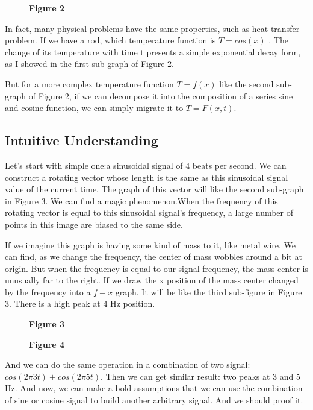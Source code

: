\documentclass[margin,line]{res}
\begin{document}
\begin{resume}
\begin{figure}[H]
\begin{minipage}{0.55\linewidth}
    \centerline{\textbf{Figure 2}}
  \end{minipage}
\end{figure}
In fact, many physical problems have the same properties, such as heat transfer problem. If we have a rod, which temperature function is $T=cos(x)$ .
The change of its temperature with time t presents a simple exponential decay form, as I showed in the first sub-graph of Figure 2.\par
But for a more complex temperature function $T=f(x)$ like the second sub-graph of Figure 2, if we can decompose it into the composition of a series sine and cosine function, we can simply migrate it to $T=F(x,t)$.

\subsection{\textbf{Intuitive Understanding}}

Let's start with simple one:a sinusoidal signal of 4 beats per second. We can construct a rotating vector whose length is the same as this sinusoidal signal value of the current time. The graph of this vector will like the second sub-graph in Figure 3. We can find a magic phenomenon.When the frequency of this rotating vector is equal to this sinusoidal signal's frequency, a large number of points in this image are biased to the same side.\par
If we imagine this graph is having some kind of mass to it, like metal wire. We can find, as we change the frequency, the center of mass wobbles around a bit at origin. But when the frequency is equal to our signal frequency, the mass center is unusually far to the right. If we draw the x position of the mass center changed by the frequency into a $f-x$ graph. It will be like the third sub-figure in Figure 3. There is a high peak at 4 Hz position.\par
\begin{figure}[H]
	\begin{minipage}{0.48\linewidth}
		\centerline{}
		\centerline{\textbf{Figure 3}}
	\end{minipage}
	\begin{minipage}{0.48\linewidth}
		\centerline{}
		\centerline{\textbf{Figure 4}}
	\end{minipage}
\end{figure}
And we can do the same operation in a combination of two signal: $cos(2\pi 3t)+cos(2\pi 5t)$. Then we can get similar result: two peaks at 3 and 5 Hz. And now, we can make a bold assumptions that we can use the combination of sine or cosine signal to build another arbitrary signal. And we should proof it.


\end{resume}
\end{document}
